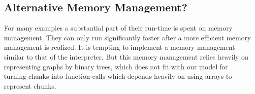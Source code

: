 \subsection{Alternative Memory Management?}
For many \Sapljs examples a substantial part of their run-time is spent on memory management. 
They can only run significantly faster after a more efficient memory management is realized.
It is tempting to implement a memory management similar to that of the \Sapl interpreter. 
But this memory management relies heavily on representing graphs by binary trees, 
which does not fit with our model for turning chunks into \JS function calls which depends heavily on using arrays to
represent chunks.




